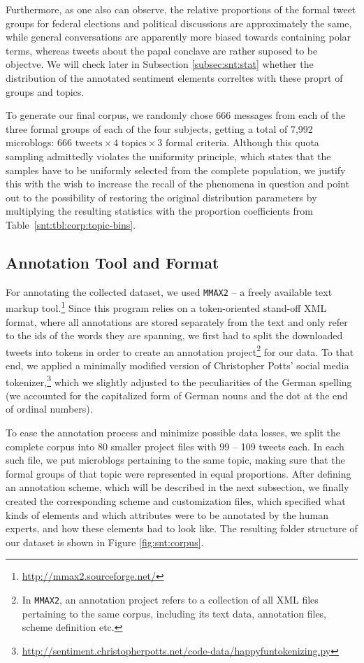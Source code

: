 Furthermore, as one also can observe, the relative proportions of the
formal tweet groups for federal elections and political discussions
are approximately the same, while general conversations are apparently
more biased towards containing polar terms, whereas tweets about the
papal conclave are rather suposed to be objectve.  We will check later
in Subsection \ref{subsec:snt:stat} whether the distribution of the
annotated sentiment elements correltes with these proprt of
groups and topics.

To generate our final corpus, we randomly chose 666 messages from each
of the three formal groups of each of the four subjects, getting a
total of 7,992 microblogs: $666\text{ tweets} \times 4\text{ topics}
\times 3\text{ formal criteria}$.  Although this quota sampling
admittedly violates the uniformity principle, which states that the
samples have to be uniformly selected from the complete population, we
justify this with the wish to increase the recall of the phenomena in
question and point out to the possibility of restoring the original
distribution parameters by multiplying the resulting statistics with
the proportion coefficients from Table~\ref{snt:tbl:corp:topic-bins}.

\subsection{Annotation Tool and Format}\label{subsec:snt:tformat}

For annotating the collected dataset, we used \texttt{MMAX2} -- a
freely available text markup
tool.\footnote{\url{http://mmax2.sourceforge.net/}} Since this program
relies on a token-oriented stand-off XML format, where all annotations
are stored separately from the text and only refer to the ids of the
words they are spanning, we first had to split the downloaded tweets
into tokens in order to create an annotation project\footnote{In
  \texttt{MMAX2}, an annotation project refers to a collection of all
  XML files pertaining to the same corpus, including its text data,
  annotation files, scheme definition etc.} for our data.  To that
end, we applied a minimally modified version of Christopher Potts'
social media
tokenizer,\footnote{\url{http://sentiment.christopherpotts.net/code-data/happyfuntokenizing.py}}
which we slightly adjusted to the peculiarities of the German spelling
(we accounted for the capitalized form of German nouns and the dot at
the end of ordinal numbers).

To ease the annotation process and minimize possible data losses, we
split the complete corpus into 80 smaller project files with 99 -- 109
tweets each.  In each such file, we put microblogs pertaining to the
same topic, making sure that the formal groups of that topic were
represented in equal proportions.  After defining an annotation
scheme, which will be described in the next subsection, we finally
created the corresponding scheme and customization files, which
specified what kinds of elements and which attributes were to be
annotated by the human experts, and how these elements had to look
like.  The resulting folder structure of our dataset is shown in
Figure \ref{fig:snt:corpus}.

